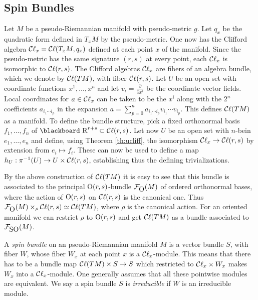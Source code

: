 \documentclass[12pt,titlepage]{article}
\def\bbf#1{\hbox{\blackboard #1}}
\def\lR{\bbf R}
\def\cC{{\cal C}}
\def\cF{{\cal F}}
\def\Cl{{\cC\ell}}
\def\O{\hbox{O}}
\def\SO{\hbox{SO}}
\def\ppv#1#2{\frac{\partial}{\partial #1^#2}}
\begin{document}
\subsection{Spin Bundles}\label{sec:spinbundles}
Let \(M\) be a pseudo-Riemannian manifold with pseudo-metric \(g\). Let
\(q_x\) be the quadratic form defined in \(T_xM\) by the pseudo-metric.
One now has the Clifford algebra \(\Cl_x=\Cl(T_xM,q_x)\)
defined at each point \(x\) of the manifold. Since the
pseudo-metric has the same signature \((r,s)\) at every point,
each \(\Cl_x\) is isomorphic to \(\Cl(r,s)\). The Clifford algebras
\(\Cl_x\) are fibers of an algebra bundle, which we denote by \(\Cl(TM)\),
with fiber \(\Cl(r,s)\). Let \(U\) be an open set with coordinate
functions \(x^1,\dots,x^n\) and let \(v_i = \ppv{x}{i}\) be the
coordinate vector fields. Local coordinates for \(a \in \Cl_x\) can be
taken to be the \(x^i\) along with the \(2^n\) coefficients
\(a_{i_1\cdots i_p}\)
in the expansion \(a = \sum_{p=0}^n a_{i_1\cdots
i_p}v_{i_1}\cdots v_{i_p}\). This defines \(\Cl(TM)\) as a manifold. 
To define the bundle structure, pick a fixed
orthonormal basis \(f_1,\dots,f_n\) of \(\lR^{r+s}\subset \Cl(r,s)\).
Let now \(U\) be an open set with \(n\)-bein \(e_1,\dots,e_n\) and
define, using Theorem \ref{th:ucliff}, the  isomorphism \(\Cl_x\to\Cl(r,s)\)
 by extension from \(e_i\mapsto f_i\).
These can now be used to define a map \(h_U:\pi^{-1}(U)\to
U\times\Cl(r,s)\), establishing thus the defining  trivializations.



By the above construction of \(\Cl(TM)\) it is easy to see that this
bundle is associated to the principal \(\O(r,s)\)-bundle \(\cF_{\O}(M)\)
of ordered orthonormal bases, where the action of \(\O(r,s)\) on
\(\Cl(r,s)\) is the canonical one. Thus
\(\cF_{\O}(M)\times_\rho\Cl(r,s)\simeq\Cl(TM)\), where \(\rho\) is the
canonical action. For an oriented manifold we can restrict \(\rho\) to
\(\O(r,s)\) and get \(\Cl(TM)\) as a bundle associated to
\(\cF_{\SO}(M)\).

A {\em spin bundle\/}
%
 on an pseudo-Riemannian manifold \(M\) is
a vector bundle \(S\), with fiber \(W\), whose fiber \(W_x\)
at each point \(x\)
is a \(\Cl_x\)-module.
This means that there has to be a bundle map \(\Cl(TM)\times S \to S\)
which restricted to \(\Cl_x\times W_x\) makes \(W_x\) into a 
\(\Cl_x\)-module. One generally assumes that all 
these pointwise modules are equivalent.
We say a spin bundle \(S\) is {\em irreducible\/} if \(W\) is an
irreducible module.
%
\end{document}
